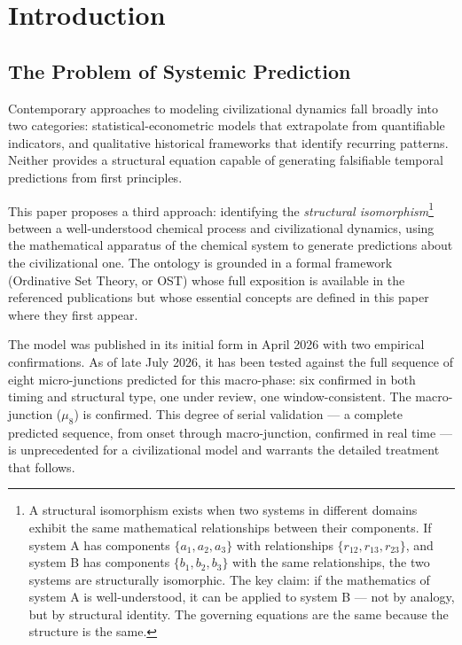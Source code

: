 \documentclass[12pt,a4paper]{article}
\begin{document}
\newpage
\tableofcontents
\newpage


\section{Introduction}

\subsection{The Problem of Systemic Prediction}

Contemporary approaches to modeling civilizational dynamics fall broadly into two categories: statistical-econometric models that extrapolate from quantifiable indicators, and qualitative historical frameworks that identify recurring patterns. Neither provides a structural equation capable of generating falsifiable temporal predictions from first principles.

This paper proposes a third approach: identifying the \emph{structural isomorphism}\footnote{A structural isomorphism exists when two systems in different domains exhibit the same mathematical relationships between their components. If system A has components $\{a_1, a_2, a_3\}$ with relationships $\{r_{12}, r_{13}, r_{23}\}$, and system B has components $\{b_1, b_2, b_3\}$ with the same relationships, the two systems are structurally isomorphic. The key claim: if the mathematics of system A is well-understood, it can be applied to system B --- not by analogy, but by structural identity. The governing equations are the same because the structure is the same.} between a well-understood chemical process and civilizational dynamics, using the mathematical apparatus of the chemical system to generate predictions about the civilizational one. The ontology is grounded in a formal framework (Ordinative Set Theory, or OST) whose full exposition is available in the referenced publications \cite{te_ordinative_sets,ost_v21} but whose essential concepts are defined in this paper where they first appear.

The model was published in its initial form in April 2026 with two empirical confirmations. As of late July 2026, it has been tested against the full sequence of eight micro-junctions predicted for this macro-phase: six confirmed in both timing and structural type, one under review, one window-consistent. The macro-junction ($\mu_8$) is confirmed. This degree of serial validation --- a complete predicted sequence, from onset through macro-junction, confirmed in real time --- is unprecedented for a civilizational model and warrants the detailed treatment that follows.
\end{document}
